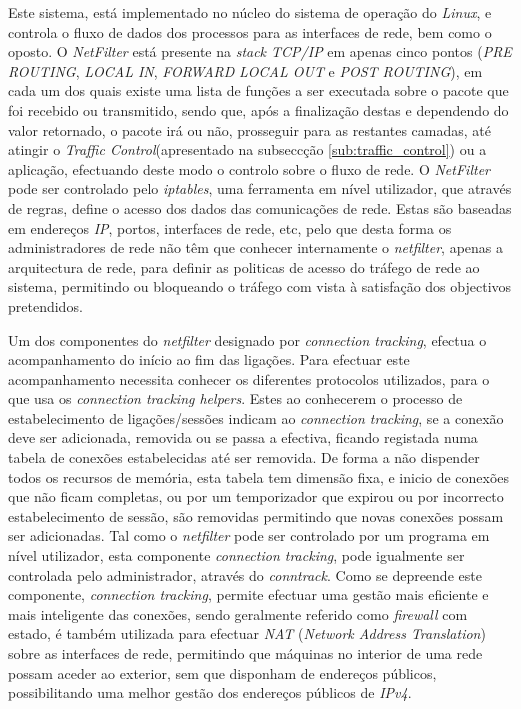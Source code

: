 Este sistema, está implementado no núcleo do sistema de operação do \textit{Linux}, e controla o fluxo de dados dos processos para as interfaces de rede, bem como o oposto.
O \textit{NetFilter} está presente na \textit{stack TCP/IP} em apenas cinco pontos (\textit{PRE ROUTING}, \textit{LOCAL IN}, \textit{FORWARD} \textit{LOCAL OUT} e \textit{POST ROUTING}), em cada um dos quais existe uma lista de funções a ser executada sobre o pacote que foi recebido ou transmitido, sendo que, após a finalização destas e dependendo do valor retornado, o pacote irá ou não, prosseguir para as restantes camadas, até atingir o \textit{Traffic Control}(apresentado na subseccção \ref{sub:traffic_control}) ou a aplicação, efectuando deste modo o controlo sobre o fluxo de rede.
O \textit{NetFilter} pode ser controlado pelo \textit{iptables}, uma ferramenta em nível utilizador, que através de regras, define o acesso dos dados das comunicações \color{red} de \color{black} rede.
Estas são baseadas em endereços \textit{IP}, portos, interfaces de rede, etc, pelo que desta forma os administradores de rede não têm que conhecer internamente o \textit{netfilter}, apenas a arquitectura de rede, para definir as politicas de acesso do tráfego de rede ao sistema, permitindo ou bloqueando o tráfego com vista à satisfação dos objectivos pretendidos. 

Um dos componentes do \textit{netfilter} designado por \textit{connection tracking}, efectua o acompanhamento do início ao fim das ligações.
Para efectuar este acompanhamento necessita conhecer os diferentes protocolos utilizados, para o que usa os \textit{connection tracking helpers}.
Estes ao conhecerem o processo de estabelecimento de ligações/sessões indicam ao \textit{connection tracking}, se a conexão deve ser adicionada, removida ou se passa a efectiva, ficando registada numa tabela de conexões estabelecidas até ser removida.
De forma a não dispender todos os recursos de memória, esta tabela tem dimensão fixa, e inicio de conexões que não ficam completas, ou por um temporizador que expirou ou por incorrecto estabelecimento de sessão, são removidas permitindo que novas conexões possam ser adicionadas.
Tal como o \textit{netfilter} pode ser controlado por um programa em nível utilizador, esta componente \textit{connection tracking}, pode igualmente ser controlada pelo administrador, através do \textit{conntrack}.
Como se depreende este componente, \textit{connection tracking}, permite efectuar uma gestão mais eficiente e mais inteligente das conexões, sendo geralmente referido como \textit{firewall} com estado, é também utilizada para efectuar \textit{NAT} (\textit{Network Address Translation}) sobre as interfaces de rede, permitindo que máquinas no interior de uma rede possam aceder ao exterior, sem que disponham de endereços públicos, possibilitando uma melhor gestão dos endereços públicos de \textit{IPv4}.

